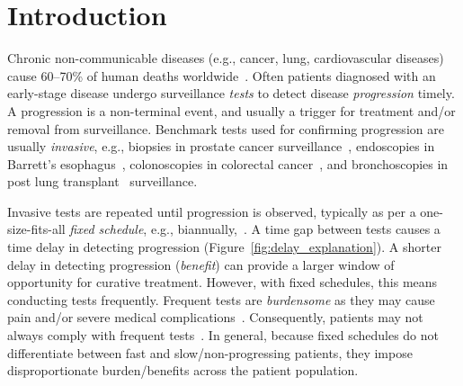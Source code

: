 \section{Introduction}
\label{sec:introduction}
Chronic non-communicable diseases (e.g., cancer, lung, cardiovascular diseases) cause 60--70\% of human deaths worldwide~\citep{world2014global}. Often patients diagnosed with an early-stage disease undergo surveillance \emph{tests} to detect disease \emph{progression} timely. A progression is a non-terminal event, and usually a trigger for treatment and/or removal from surveillance. Benchmark tests used for confirming progression are usually \emph{invasive}, e.g., biopsies in prostate cancer surveillance~\citep{bokhorst2015compliance}, endoscopies in Barrett's esophagus~\citep{weusten2017endoscopic}, colonoscopies in colorectal cancer~\citep{krist2007timing}, and bronchoscopies in post lung transplant~\citep{mcwilliams2008surveillance} surveillance.

Invasive tests are repeated until progression is observed, typically as per a one-size-fits-all \emph{fixed schedule}, e.g., biannually,~\citep{krist2007timing,mcwilliams2008surveillance,bokhorst2015compliance}. A time gap between tests causes a time delay in detecting progression (Figure~\ref{fig:delay_explanation}). A shorter delay in detecting progression (\emph{benefit}) can provide a larger window of opportunity for curative treatment. However, with fixed schedules, this means conducting tests frequently. Frequent tests are \textit{burdensome} as they may cause pain and/or severe medical complications~\citep{krist2007timing,loeb2013systematic}. Consequently, patients may not always comply with frequent tests~\citep{bokhorst2015compliance, LeClercq2015325}. In general, because fixed schedules do not differentiate between fast and slow/non-progressing patients, they impose disproportionate burden/benefits across the patient population.

